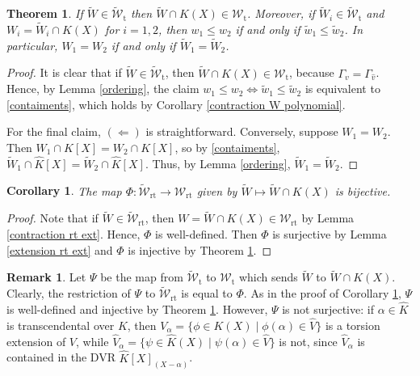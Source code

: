 \documentclass[10pt]{article}
\numberwithin{equation}{section}
\newtheorem{Thm}[equation]{Theorem}
\newtheorem{Cor}[equation]{Corollary}
\theoremstyle{definition}
\newtheorem{Rem}[equation]{Remark}
\theoremstyle{definition}
\newcommand{\K}{\widehat{K}}
\newcommand{\V}{\widehat{V}}
\newcommand{\rt}{\text{rt}}
\renewcommand{\t}{\text{t}}
\newcommand{\wW}{\widetilde{W}}
\begin{document}
\begin{Thm}\label{contraction torsion exts}
If $\wW\in \widetilde{\mathcal W}_{\t}$ then $\wW\cap K(X)\in \mathcal W_{\t}$. Moreover,  if $\wW_i\in \widetilde{\mathcal W}_{\t}$ and $W_i=\wW_i\cap K(X)$ for $i=1,2$, then $w_1\leq w_2$ if and only if $\tilde w_1\leq \tilde w_2$. In particular, $W_1=W_2$ if and only if $\wW_1=\wW_2$.
\end{Thm}
\begin{proof}
It is clear that if $\wW\in\widetilde{\mathcal W}_{\t}$, then $\wW\cap K(X)\in \mathcal W_{\t}$, 
because $\Gamma_v=\Gamma_{\hat v}$.
Hence, by Lemma \ref{ordering}, the claim $w_1\leq w_2\Leftrightarrow\tilde w_1\leq \tilde w_2$ 
is equivalent to \eqref{contaiments}, which holds by Corollary \ref{contraction W polynomial}.

For the final claim, $(\Leftarrow)$ is straightforward. Conversely, suppose $W_1=W_2$. 
Then $W_1\cap K[X]= W_2\cap K[X]$, so by \eqref{contaiments}, $\wW_1\cap \K[X]=\wW_2\cap \K[X]$. 
Thus, by Lemma \ref{ordering}, $\wW_1=\wW_2$.
\end{proof}


\begin{Cor}\label{bijection rt}
The map $\Phi:\widetilde{\mathcal W}_{\rt} \to \mathcal W_{\rt}$ given by 
$\wW \mapsto \wW\cap K(X)$ is bijective. 
\end{Cor}
\begin{proof}
Note that if $\wW\in\widetilde{\mathcal W}_{\rt}$, then $W=\wW\cap K(X)\in \mathcal W_{\rt}$ by Lemma \ref{contraction rt ext}.
Hence, $\Phi$ is well-defined. Then $\Phi$ is  surjective by Lemma \ref{extension rt ext}
and $\Phi$ is injective by Theorem \ref{contraction torsion exts}.
\end{proof}

\begin{Rem}
Let $\Psi$ be the map from $\widetilde{\mathcal W}_{\t}$ to $\mathcal W_{\t}$ which sends $\wW$ to $\wW\cap K(X)$. Clearly, the restriction of $\Psi$ to $\widetilde{\mathcal W}_{\rt}$ is equal to $\Phi$.  As in the proof of Corollary \ref{bijection rt}, $\Psi$ is well-defined and injective by Theorem \ref{contraction torsion exts}. However, $\Psi$ is not surjective: if $\alpha\in\K$ is transcendental over $K$, then $V_{\alpha}=\{\phi\in K(X) \mid \phi(\alpha)\in\V\}$ is a torsion extension of $V$, while $\V_{\alpha}=\{\psi\in \K(X) \mid \psi(\alpha)\in\V\}$ is not, since $\V_{\alpha}$ is contained in the DVR $\K[X]_{(X-\alpha)}$.
\end{Rem}
\end{document}
